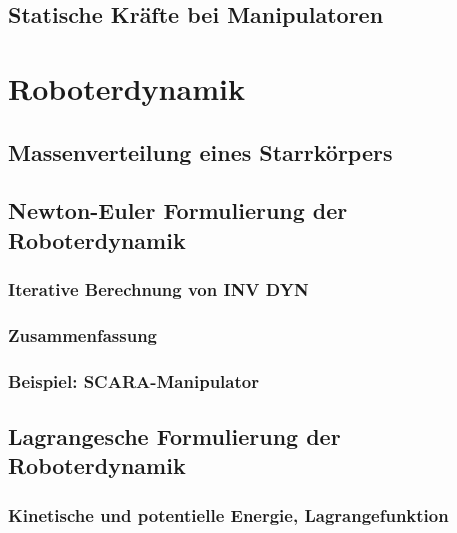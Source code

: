 \documentclass[a4paper, 11pt, accentcolor = tud3b]{tudreport}
\begin{document}
		\section{Statische Kräfte bei Manipulatoren} %

	\chapter{Roboterdynamik} %

		\section{Massenverteilung eines Starrkörpers} %

		\section{Newton-Euler Formulierung der Roboterdynamik} %

			\subsection{Iterative Berechnung von INV DYN} %

			\subsection{Zusammenfassung} %

			\subsection{Beispiel: SCARA-Manipulator} %

		\section{Lagrangesche Formulierung der Roboterdynamik} %

			\subsection{Kinetische und potentielle Energie, Lagrangefunktion} %
\end{document}
